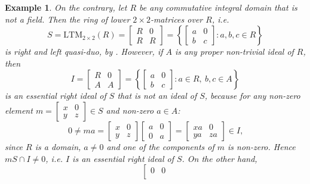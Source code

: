 \documentclass{amsart}
\theoremstyle{plain}
\newtheorem{example}[theorem]{Example}
\numberwithin{equation}{section}
\begin{document}
\begin{example}
On the contrary, let $R$ be any commutative integral domain that is not a field. Then the ring of lower $2 \times 2$-matrices over $R$, i.e.
\begin{equation*}S =\mathrm{L} \mathrm{T} \mathrm{M}_{2 \times 2} (R) =\left [\begin{array}{cc}R & 0 \\
R & R\end{array}\right ] =\left \{\left [\begin{array}{cc}a & 0 \\
b & c\end{array}\right ] :a ,b ,c \in R\right \}
\end{equation*}is right and left quasi-duo, by \cite[Proposition 2.1]{Y}.
However, if $A$ is any proper non-trivial ideal of $R$, then
\begin{equation*}I =\left [\begin{array}{cc}R & 0 \\
A & A\end{array}\right ] =\left \{\left [\begin{array}{cc}a & 0 \\
b & c\end{array}\right ] :a \in R ,
\:
b ,c \in A\right \}
\end{equation*}is an essential right ideal of $S$ that is not an ideal of $S$, because for any non-zero element $m =\left [\begin{array}{cc}x & 0 \\
y & z\end{array}\right ] \in S$ and non-zero $a \in A$:
\begin{equation*}0 \neq m a =\left [\begin{array}{cc}x & 0 \\
y & z\end{array}\right ] \left [\begin{array}{cc}a & 0 \\
0 & a\end{array}\right ] =\left [\begin{array}{cc}x a & 0 \\
y a & z a\end{array}\right ] \in I\text{,}
\end{equation*}since $R$ is a domain, $a \neq 0$ and one of the components of $m$ is non-zero. Hence $m S \cap I \neq 0$, i.e. $I$ is an essential right ideal of $S$. On the other hand,
\begin{equation*}\left [\begin{array}{cc}0 & 0 \\

\end{array}
\end{equation*}
\end{example}
\end{document}
